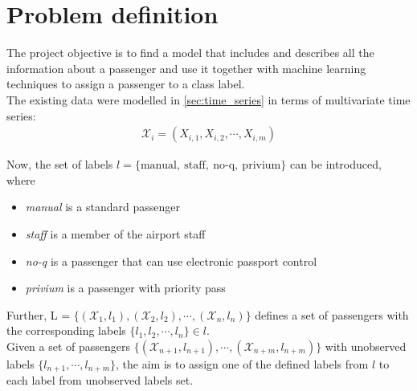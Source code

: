 \section{Problem definition}

The project objective is to find a model that includes and describes all the information about a passenger and use it together with machine learning techniques to assign a passenger to a class label.\\
The existing data were modelled in \cref{sec:time_series} in terms of multivariate time series:
\begin{align*}
	\mathcal{X}_i = (X_{i,1}, X_{i,2}, \cdots, X_{i,m})
\end{align*}

Now, the set of labels $l = \{\text{manual},\ \text{staff},\ \text{no-q},\ \text{privium}\}$ can be introduced, where

\begin{itemize}
	\item \textit{manual} is a standard passenger
	\item \textit{staff} is a member of the airport staff
	\item \textit{no-q} is a passenger that can use electronic passport control
	\item \textit{privium} is a passenger with priority pass
\end{itemize}

Further, L = $\{(\mathcal{X}_1, l_1),(\mathcal{X}_2, l_2), \cdots, (\mathcal{X}_n, l_n)\}$ defines a set of passengers with the corresponding labels $\{l_1, l_2, \cdots, l_n \} \in l$.\\


Given a set of passengers $\{(\mathcal{X}_{n+1}, l_{n+1}), \cdots, (\mathcal{X}_{n+m},l_{n+m}) \}$ with unobserved labels $\{l_{n+1}, \cdots, l_{n+m} \}$, the aim is to assign one of the defined labels from $l$ to each label from unobserved labels set. 
